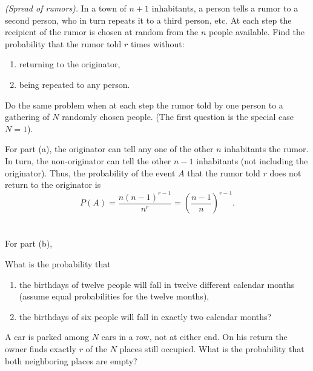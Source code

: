 \begin{problem}[Handout 2, \# 13]
  \emph{(Spread of rumors).} In a town of \(n+1\) inhabitants, a person
  tells a rumor to a second person, who in turn repeats it to a third
  person, etc. At each step the recipient of the rumor is chosen at random
  from the \(n\) people available. Find the probability that the rumor told
  \(r\) times without:
  \begin{enumerate}[label=(\alph*),noitemsep]
  \item returning to the originator,
  \item being repeated to any person.
  \end{enumerate}
  Do the same problem when at each step the rumor told by one person to a
  gathering of \(N\) randomly chosen people. (The first question is the
  special case \(N=1\)).
\end{problem}
\begin{solution*}
  For part (a), the originator can tell any one of the other \(n\)
  inhabitants the rumor. In turn, the non-originator can tell the other
  \(n-1\) inhabitants (not including the originator). Thus, the probability
  of the event \(A\) that the rumor told \(r\) does not return to the
  originator is
  \[
    P(A)=\frac{n(n-1)^{r-1}}{n^r}=\left(\frac{n-1}{n}\right)^{r-1}.
  \]
  \\\\
  For part (b),
\end{solution*}

\begin{problem}[Handout 2, \# 14]
  What is the probability that
  \begin{enumerate}[label=(\alph*),noitemsep]
  \item the birthdays of twelve people will fall in twelve different
    calendar months (assume equal probabilities for the twelve months),
  \item the birthdays of six people will fall in exactly two calendar
    months?
  \end{enumerate}
\end{problem}
\begin{solution*}
\end{solution*}

\begin{problem}[Handout 2, \# 15]
  A car is parked among \(N\) cars in a row, not at either end. On his
  return the owner finds exactly \(r\) of the \(N\) places still
  occupied. What is the probability that both neighboring places are empty?
\end{problem}
\begin{solution*}
\end{solution*}

